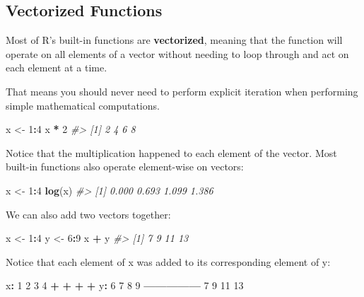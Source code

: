 \documentclass[]{book}
\newenvironment{Shaded}{\begin{snugshade}}{\end{snugshade}}
\newcommand{\KeywordTok}[1]{\textcolor[rgb]{0.13,0.29,0.53}{\textbf{#1}}}
\newcommand{\DecValTok}[1]{\textcolor[rgb]{0.00,0.00,0.81}{#1}}
\newcommand{\StringTok}[1]{\textcolor[rgb]{0.31,0.60,0.02}{#1}}
\newcommand{\CommentTok}[1]{\textcolor[rgb]{0.56,0.35,0.01}{\textit{#1}}}
\newcommand{\OperatorTok}[1]{\textcolor[rgb]{0.81,0.36,0.00}{\textbf{#1}}}
\newcommand{\NormalTok}[1]{#1}
\begin{document}
\subsection{Vectorized Functions}\label{vectorized-functions}

Most of R's built-in functions are \textbf{vectorized}, meaning that the
function will operate on all elements of a vector without needing to
loop through and act on each element at a time.

That means you should never need to perform explicit iteration when
performing simple mathematical computations.

\begin{Shaded}
\begin{Highlighting}[]
\NormalTok{x <-}\StringTok{ }\DecValTok{1}\OperatorTok{:}\DecValTok{4}
\NormalTok{x }\OperatorTok{*}\StringTok{ }\DecValTok{2}
\CommentTok{#> [1] 2 4 6 8}
\end{Highlighting}
\end{Shaded}

Notice that the multiplication happened to each element of the vector.
Most built-in functions also operate element-wise on vectors:

\begin{Shaded}
\begin{Highlighting}[]
\NormalTok{x <-}\StringTok{ }\DecValTok{1}\OperatorTok{:}\DecValTok{4}
\KeywordTok{log}\NormalTok{(x)}
\CommentTok{#> [1] 0.000 0.693 1.099 1.386}
\end{Highlighting}
\end{Shaded}

We can also add two vectors together:

\begin{Shaded}
\begin{Highlighting}[]
\NormalTok{x <-}\StringTok{ }\DecValTok{1}\OperatorTok{:}\DecValTok{4}
\NormalTok{y <-}\StringTok{ }\DecValTok{6}\OperatorTok{:}\DecValTok{9}
\NormalTok{x }\OperatorTok{+}\StringTok{ }\NormalTok{y}
\CommentTok{#> [1]  7  9 11 13}
\end{Highlighting}
\end{Shaded}

Notice that each element of x was added to its corresponding element of
y:

\begin{Shaded}
\begin{Highlighting}[]
\NormalTok{x}\OperatorTok{:}\StringTok{  }\DecValTok{1}  \DecValTok{2}  \DecValTok{3}  \DecValTok{4}
    \OperatorTok{+}\StringTok{  }\OperatorTok{+}\StringTok{  }\OperatorTok{+}\StringTok{  }\OperatorTok{+}
\NormalTok{y}\OperatorTok{:}\StringTok{  }\DecValTok{6}  \DecValTok{7}  \DecValTok{8}  \DecValTok{9}
\OperatorTok{---------------}
\StringTok{    }\DecValTok{7}  \DecValTok{9} \DecValTok{11} \DecValTok{13}
\end{Highlighting}
\end{Shaded}
\end{document}
